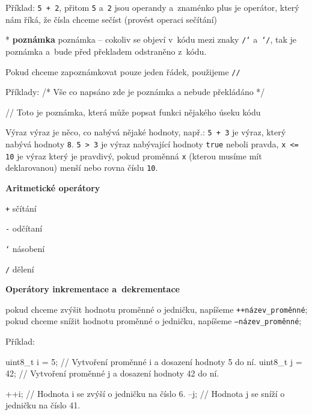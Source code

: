 Příklad: {\tt 5 + 2}, přitom {\tt 5} a~{\tt 2} jsou operandy a~znaménko plus je operátor, který nám říká, že čísla chceme sečíst (provést operaci sečítání)


* {\bf poznámka} \ii poznámka -- cokoliv se objeví v~kódu mezi znaky {\tt /\char`\*} a~{\tt \char`\*/}, tak je poznámka a~bude před překladem odstraněno z~kódu. 

Pokud chceme zapoznámkovat pouze jeden řádek, použijeme {\tt //}

Příklady:
 \begtt 
/* Vše co napsáno zde
je poznámka a nebude překládáno
*/
\endtt

 \begtt 
// Toto je poznámka, která může popsat funkci nějakého úseku kódu
\endtt

\enditems




Výraz \ii výraz je něco, co nabývá nějaké hodnoty, např.: { \tt  5 + 3} je výraz, který nabývá hodnoty { \tt  8}. { \tt  5 > 3} je výraz nabývající hodnoty { \tt  true} neboli pravda, { \tt  x <= 10} je výraz který je pravdivý, pokud proměnná { \tt  x} (kterou musíme mít deklarovanou) menší nebo rovna číslu { \tt  10}. 


{ \bf Aritmetické operátory} 

{ \tt  +} sčítání 

{ \tt  -} odčítaní 

{ \tt  \char`\*} násobení 

{ \tt  /} dělení 

{ \bf Operátory inkrementace a~dekrementace}

pokud chceme zvýšit hodnotu proměnné o jedničku, napíšeme 
{ \tt  ++název\_proměnné};
pokud chceme snížit hodnotu proměnné o jedničku, napíšeme { \tt  --název\_proměnné};

Příklad:

 \begtt 
uint8_t i = 5;  // Vytvoření proměnné i a dosazení hodnoty 5 do ní.  
uint8_t j = 42; // Vytvoření proměnné j a dosazení hodnoty 42 do ní. 

++i;  // Hodnota i se zvýší o jedničku na číslo 6.
--j;  // Hodnota j se sníží o jedničku na číslo 41.
\endtt



